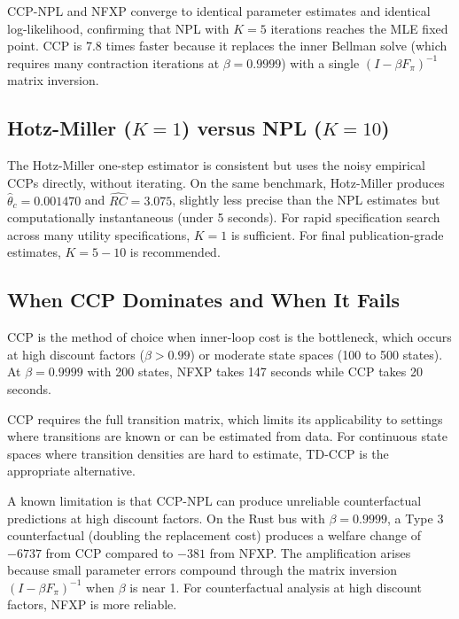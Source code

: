 \documentclass[11pt]{article}
\begin{document}
CCP-NPL and NFXP converge to identical parameter estimates and identical log-likelihood, confirming that NPL with $K\!=\!5$ iterations reaches the MLE fixed point. CCP is 7.8 times faster because it replaces the inner Bellman solve (which requires many contraction iterations at $\beta = 0.9999$) with a single $(I - \beta F_\pi)^{-1}$ matrix inversion.

\subsection{Hotz-Miller ($K\!=\!1$) versus NPL ($K\!=\!10$)}

The Hotz-Miller one-step estimator is consistent but uses the noisy empirical CCPs directly, without iterating. On the same benchmark, Hotz-Miller produces $\hat\theta_c = 0.001470$ and $\hat{RC} = 3.075$, slightly less precise than the NPL estimates but computationally instantaneous (under 5 seconds). For rapid specification search across many utility specifications, $K\!=\!1$ is sufficient. For final publication-grade estimates, $K\!=\!5{-}10$ is recommended.

\subsection{When CCP Dominates and When It Fails}

CCP is the method of choice when inner-loop cost is the bottleneck, which occurs at high discount factors ($\beta > 0.99$) or moderate state spaces (100 to 500 states). At $\beta = 0.9999$ with 200 states, NFXP takes 147 seconds while CCP takes 20 seconds.

CCP requires the full transition matrix, which limits its applicability to settings where transitions are known or can be estimated from data. For continuous state spaces where transition densities are hard to estimate, TD-CCP is the appropriate alternative.

A known limitation is that CCP-NPL can produce unreliable counterfactual predictions at high discount factors. On the Rust bus with $\beta = 0.9999$, a Type 3 counterfactual (doubling the replacement cost) produces a welfare change of $-6737$ from CCP compared to $-381$ from NFXP. The amplification arises because small parameter errors compound through the matrix inversion $(I-\beta F_\pi)^{-1}$ when $\beta$ is near 1. For counterfactual analysis at high discount factors, NFXP is more reliable.


\end{document}
